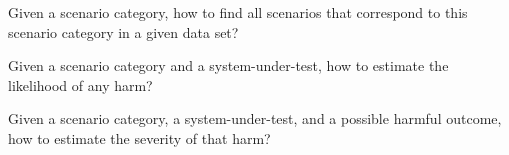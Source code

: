 \begin{problem}[Exposure]
	\label{problem:exposure}
	Given a scenario category, how to find all scenarios that correspond to this scenario category in a given data set?
\end{problem}

\begin{problem}
	\label{problem:controllability}
	Given a scenario category and a system-under-test, how to estimate the likelihood of any harm?
\end{problem}

\begin{problem}[Severity]
	\label{problem:severity}
	Given a scenario category, a system-under-test, and a possible harmful outcome, how to estimate the severity of that harm?
\end{problem}
